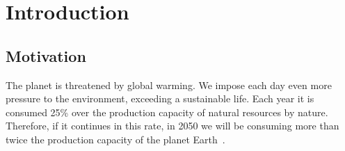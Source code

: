 


\chapter{Introduction} \label{chap1:introduction}




\section{Motivation} \label{sec1:motivation}

    The planet is threatened by global warming. We impose each day even more pressure to the environment, exceeding a sustainable life. Each year it is consumed 25\% over the production capacity of natural resources by nature. Therefore, if it continues in this rate, in 2050 we will be consuming more than twice the production capacity of the planet Earth~\cite{Townsend:2002:2050}. 
    

